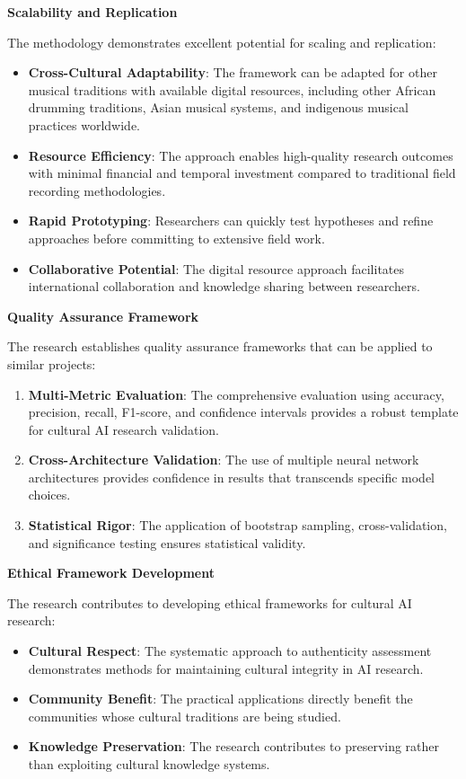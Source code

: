 \documentclass[12pt,a4paper]{article}
\begin{document}
\textbf{Scalability and Replication}

The methodology demonstrates excellent potential for scaling and replication:

\begin{itemize}
\item \textbf{Cross-Cultural Adaptability}: The framework can be adapted for other musical traditions with available digital resources, including other African drumming traditions, Asian musical systems, and indigenous musical practices worldwide.
\item \textbf{Resource Efficiency}: The approach enables high-quality research outcomes with minimal financial and temporal investment compared to traditional field recording methodologies.
\item \textbf{Rapid Prototyping}: Researchers can quickly test hypotheses and refine approaches before committing to extensive field work.
\item \textbf{Collaborative Potential}: The digital resource approach facilitates international collaboration and knowledge sharing between researchers.
\end{itemize}

\textbf{Quality Assurance Framework}

The research establishes quality assurance frameworks that can be applied to similar projects:

\begin{enumerate}
\item \textbf{Multi-Metric Evaluation}: The comprehensive evaluation using accuracy, precision, recall, F1-score, and confidence intervals provides a robust template for cultural AI research validation.
\item \textbf{Cross-Architecture Validation}: The use of multiple neural network architectures provides confidence in results that transcends specific model choices.
\item \textbf{Statistical Rigor}: The application of bootstrap sampling, cross-validation, and significance testing ensures statistical validity.
\end{enumerate}

\textbf{Ethical Framework Development}

The research contributes to developing ethical frameworks for cultural AI research:

\begin{itemize}
\item \textbf{Cultural Respect}: The systematic approach to authenticity assessment demonstrates methods for maintaining cultural integrity in AI research.
\item \textbf{Community Benefit}: The practical applications directly benefit the communities whose cultural traditions are being studied.
\item \textbf{Knowledge Preservation}: The research contributes to preserving rather than exploiting cultural knowledge systems.
\end{itemize}
\end{document}
